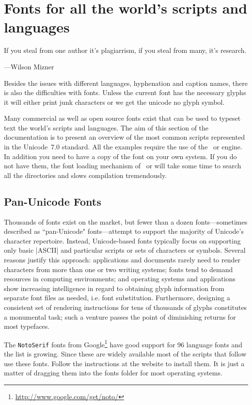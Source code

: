 \section{Fonts for all the world's scripts and languages}

\epigraph{If you steal from one author it's plagiarrism, if you steal from many, it's research.}{
---Wilson Mizner}

Besides the issues with different languages, hyphenation and caption names, there is also the difficulties with fonts. Unless the current font has the necessary glyphs it will either print junk characters or we get the unicode no glyph symbol.

Many commercial as well as open source fonts exist that can be used to typeset text the world's scripts and languages. The aim of this section of the documentation is to present an overview of the most common scripts represented in the Unicode~7.0 standard. All the examples require the use of the \XeTeX\ or \LUATEX engine. In addition you need to have a copy of the font on your own system. If you do not have them, the font loading mechanism of \XeTeX\ or \LUATEX will take some time to search all the directories and slows compilation tremendously. 

\subsection{Pan-Unicode Fonts}

Thousands of fonts exist on the market, but fewer than a dozen fonts—sometimes described as ``pan-Unicode" fonts—attempt to support the majority of Unicode's character repertoire. Instead, Unicode-based fonts typically focus on supporting only basic |ASCII| and particular scripts or sets of characters or symbols. Several reasons justify this approach: applications and documents rarely need to render characters from more than one or two writing systems; fonts tend to demand resources in computing environments; and operating systems and applications show increasing intelligence in regard to obtaining glyph information from separate font files as needed, i.e. font substitution. Furthermore, designing a consistent set of rendering instructions for tens of thousands of glyphs constitutes a monumental task; such a venture passes the point of diminishing returns for most typefaces.

The \texttt{NotoSerif} fonts from Google\footnote{\protect\url{http://www.google.com/get/noto/}} have good support for 96 language fonts and the list is growing. Since these are widely available most of the scripts that follow use these fonts. Follow the instructions at the website to install them. It is just a matter of dragging them into the fonts folder for most operating systems.

